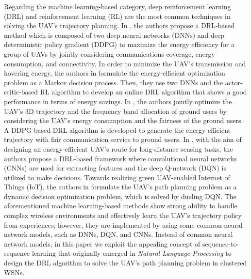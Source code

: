 \documentclass[journal]{IEEEtran}
\begin{document}
Regarding the machine learning-based category, deep reinforcement learning (DRL) and reinforcement learning (RL) are the most common techniques in solving the UAV's trajectory planning. In \cite{C. H. Liu}, the authors propose a DRL-based method which is composed of two deep neural networks (DNNs) and deep deterministic policy gradient (DDPG) to maximize the energy efficiency for a group of UAVs by jointly considering communications coverage, energy consumption, and connectivity.  In order to minimize the UAV's transmission and hovering energy, the authors in \cite{Y. Yuan} formulate the energy-efficient optimization problem as a Markov decision process. Then, they use two DNNs and the actor-critic-based RL algorithm to develop an online DRL algorithm that shows a good performance in terms of energy savings. In \cite{R. Ding}, the authors jointly optimize the UAV's 3D trajectory and the frequency band allocation of ground users by considering the UAV's energy consumption and the fairness of the ground users.  A DDPG-based DRL algorithm is developed to generate the energy-efficient trajectory with fair communication service to ground users. In \cite{B. Zhang}, with the aim of designing an energy-efficient UAV's route for long-distance sensing tasks, the authors propose a DRL-based framework where convolutional neural networks (CNNs) are used for extracting features and the deep Q-network (DQN) is utilized to make decisions. Towards realizing green UAV-enabled Internet of Things (IoT), the authors in \cite{W. Liu} formulate the UAV's path planning problem as a dynamic decision optimization problem, which is solved by dueling DQN. The aforementioned machine learning-based methods show strong ability to handle complex wireless environments and effectively learn the UAV's trajectory policy from experiences;  however, they are implemented by using some common neural network models, such as DNNs, DQN, and CNNs. Instead of common neural network models, in this paper we exploit the appealing concept of sequence-to-sequence learning that originally emerged in \emph{Natural Language Processing} to design the DRL algorithm to solve the UAV's path planning problem in clustered WSNs.
	
\end{document}
